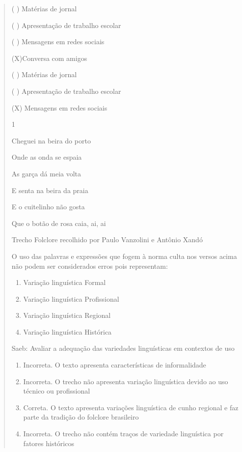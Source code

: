 {\begin{quote}
{\begin{itemize}
\begin{itemize}
( ) Matérias de jornal

( ) Apresentação de trabalho escolar

( ) Mensagens em redes sociais

(X)Conversa com amigos

( ) Matérias de jornal

( ) Apresentação de trabalho escolar

(X) Mensagens em redes sociais


\num{1}

Cheguei na beira do porto

Onde as onda se espaia

As garça dá meia volta

E senta na beira da praia

E o cuitelinho não gosta

Que o botão de rosa caia, ai, ai

Trecho Folclore recolhido por Paulo Vanzolini e Antônio Xandó

O uso das palavras e expressões que fogem à norma culta nos versos acima
não podem ser considerados erros pois representam:

\begin{enumerate}

\item
  Variação linguística Formal
\item
  Variação linguística Profissional
\item
  Variação linguística Regional
\item
  Variação linguística Histórica
\end{enumerate}

Saeb: Avaliar a adequação das variedades linguísticas em contextos de
uso

\begin{enumerate}
\def\labelenumi{\arabic{enumi}.}
\item
  Incorreta. O texto apresenta características de informalidade
\item
  Incorreta. O trecho não apresenta variação linguística devido ao uso
  técnico ou profissional
\item
  Correta. O texto apresenta variações linguística de cunho regional e
  faz parte da tradição do folclore brasileiro
\item
  Incorreta. O trecho não contém traços de variedade linguística por
  fatores históricos
\end{enumerate}


\end{itemize}
\end{itemize}}
\end{quote}}
